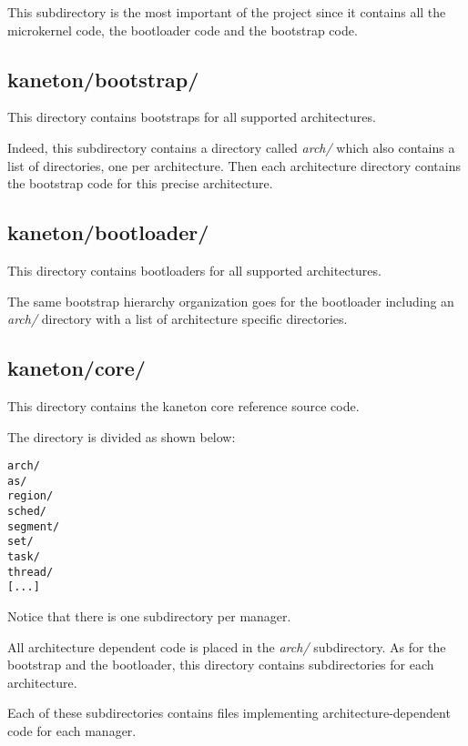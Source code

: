 This subdirectory is the most important of the project since it contains
all the microkernel code, the bootloader code and the bootstrap code.

%
%

\subsection{kaneton/bootstrap/}

This directory contains bootstraps for all supported architectures.

Indeed, this subdirectory contains a directory called \textit{arch/} which
also contains a list of directories, one per architecture. Then each
architecture directory contains the bootstrap code for this precise
architecture.

%
%

\subsection{kaneton/bootloader/}

This directory contains bootloaders for all supported architectures.

The same bootstrap hierarchy organization goes for the bootloader
including an \textit{arch/} directory with a list of architecture
specific directories.

%
%

\subsection{kaneton/core/}

This directory contains the kaneton core reference source code.

The directory is divided as shown below:

\begin{verbatim}
arch/
as/
region/
sched/
segment/
set/
task/
thread/
[...]
\end{verbatim}

Notice that there is one subdirectory per manager.

All architecture dependent code is placed in the \textit{arch/} subdirectory.
As for the bootstrap and the bootloader, this directory contains
subdirectories for each architecture.

Each of these subdirectories contains files implementing
architecture-dependent code for each manager.

